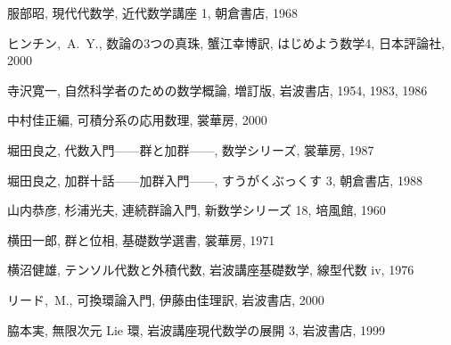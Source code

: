\documentclass[12pt,twoside]{jarticle}
\begin{document}
\begin{thebibliography}{ABCD}
服部昭, 現代代数学, 近代数学講座 1, 朝倉書店, 1968

ヒンチン,~A.~Y., 数論の3つの真珠, 蟹江幸博訳, はじめよう数学4, 日本評論社, 
2000

寺沢寛一, 自然科学者のための数学概論, 増訂版, 岩波書店, 1954, 1983, 1986

中村佳正編, 可積分系の応用数理, 裳華房, 2000

堀田良之, 代数入門——群と加群——, 数学シリーズ, 裳華房, 1987

堀田良之, 加群十話——加群入門——, すうがくぶっくす 3, 朝倉書店, 1988

山内恭彦, 杉浦光夫, 連続群論入門, 新数学シリーズ 18, 培風館, 1960

横田一郎, 群と位相, 基礎数学選書, 裳華房, 1971

横沼健雄, テンソル代数と外積代数, 岩波講座基礎数学, 線型代数 iv, 1976

リード,~M., 可換環論入門, 伊藤由佳理訳, 岩波書店, 2000

脇本実, 無限次元 Lie 環, 岩波講座現代数学の展開 3, 岩波書店, 1999

\end{thebibliography}

\end{document}
